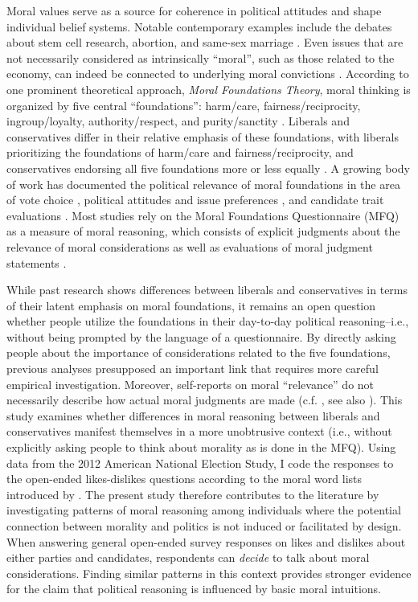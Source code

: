 \documentclass[12pt]{article}
\begin{document}
Moral values serve as a source for coherence in political attitudes and shape individual belief systems. Notable contemporary examples include the debates about stem cell research, abortion, and same-sex marriage \citep[e.g.][]{koleva2012tracing,clifford2015concerns}. Even issues that are not necessarily considered as intrinsically ``moral'', such as those related to the economy, can indeed be connected to underlying moral convictions \citep{ryan2014reconsidering}. According to one prominent theoretical approach, \textit{Moral Foundations Theory}, moral thinking is organized by five central ``foundations'': harm/care, fairness/reciprocity, ingroup/loyalty, authority/respect, and purity/sanctity \citep{haidt2008moral}. Liberals and conservatives differ in their relative emphasis of these foundations, with liberals prioritizing the foundations of harm/care and fairness/reciprocity, and conservatives endorsing all five foundations more or less equally \citep{graham2009liberals}. A growing body of work has documented the political relevance of moral foundations in the area of vote choice \citep{iyer2010beyond, franks2015using}, political attitudes and issue preferences \citep{koleva2012tracing, low2015moral, clifford2015concerns}, and candidate trait evaluations \citep{clifford2014linking}. Most studies rely on the Moral Foundations Questionnaire (MFQ) as a measure of moral reasoning, which consists of explicit judgments about the relevance of moral considerations as well as evaluations of moral judgment statements \citep[e.g.][]{graham2011mapping}.

While past research shows differences between liberals and conservatives in terms of their latent emphasis on moral foundations, it remains an open question whether people utilize the foundations in their day-to-day political reasoning--i.e., without being prompted by the language of a questionnaire. By directly asking people about the importance of considerations related to the five foundations, previous analyses presupposed an important link that requires more careful empirical investigation. Moreover, self-reports on moral ``relevance'' do not necessarily describe how actual moral judgments are made (c.f. \citealt[1031]{graham2009liberals}, see also \citealt{clifford2015moral}). This study examines whether differences in moral reasoning between liberals and conservatives manifest themselves in a more unobtrusive context (i.e., without explicitly asking people to think about morality as is done in the MFQ). Using data from the 2012 American National Election Study, I code the responses to the open-ended likes-dislikes questions according to the moral word lists introduced by \citet{graham2009liberals}. The present study therefore contributes to the literature by investigating patterns of moral reasoning among individuals where the potential connection between morality and politics is not induced or facilitated by design. When answering general open-ended survey responses on likes and dislikes about either parties and candidates, respondents can \textit{decide} to talk about moral considerations. Finding similar patterns in this context provides stronger evidence for the claim that political reasoning is influenced by basic moral intuitions.
\end{document}
